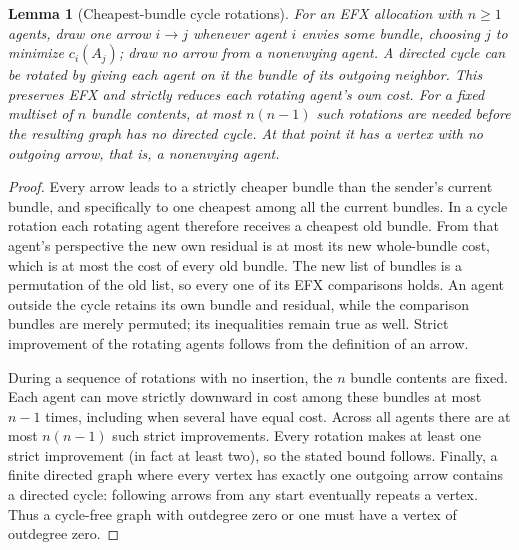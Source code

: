 \documentclass[11pt,a4paper]{article}
\newtheorem{lemma}[theorem]{Lemma}
\theoremstyle{definition}\newtheorem{definition}[theorem]{Definition}
\theoremstyle{remark}\newtheorem{remark}[theorem]{Remark}
\newcommand{\1}{\mathbf 1}
\begin{document}
\begin{lemma}[Cheapest-bundle cycle rotations]\label{lem:cycles}
For an EFX allocation with $n\ge1$ agents, draw one arrow $i\to j$ whenever agent $i$ envies some bundle, choosing $j$ to minimize $c_i(A_j)$; draw no arrow from a nonenvying agent. A directed cycle can be rotated by giving each agent on it the bundle of its outgoing neighbor. This preserves EFX and strictly reduces each rotating agent's own cost. For a fixed multiset of $n$ bundle contents, at most $n(n-1)$ such rotations are needed before the resulting graph has no directed cycle. At that point it has a vertex with no outgoing arrow, that is, a nonenvying agent.
\end{lemma}
\begin{proof}
Every arrow leads to a strictly cheaper bundle than the sender's current bundle, and specifically to one cheapest among all the current bundles. In a cycle rotation each rotating agent therefore receives a cheapest old bundle. From that agent's perspective the new own residual is at most its new whole-bundle cost, which is at most the cost of every old bundle. The new list of bundles is a permutation of the old list, so every one of its EFX comparisons holds. An agent outside the cycle retains its own bundle and residual, while the comparison bundles are merely permuted; its inequalities remain true as well. Strict improvement of the rotating agents follows from the definition of an arrow.

During a sequence of rotations with no insertion, the $n$ bundle contents are fixed. Each agent can move strictly downward in cost among these bundles at most $n-1$ times, including when several have equal cost. Across all agents there are at most $n(n-1)$ such strict improvements. Every rotation makes at least one strict improvement (in fact at least two), so the stated bound follows. Finally, a finite directed graph where every vertex has exactly one outgoing arrow contains a directed cycle: following arrows from any start eventually repeats a vertex. Thus a cycle-free graph with outdegree zero or one must have a vertex of outdegree zero.
\end{proof}
\end{document}
